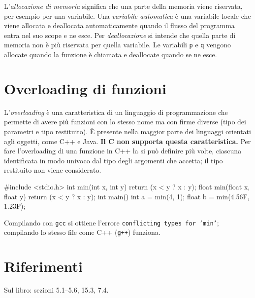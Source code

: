 \documentclass[11pt,a4paper]{article}
\begin{document}
L'\emph{allocazione di memoria} significa che una parte della memoria viene riservata, per esempio per una variabile. Una \emph{variabile automatica} è una variabile locale che viene allocata e deallocata automaticamente quando il flusso del programma entra nel suo scope e ne esce. Per \emph{deallocazione} si intende che quella parte di memoria non è più riservata per quella variabile. Le variabili \lstinline|p| e \lstinline|q| vengono allocate quando la funzione è chiamata e deallocate quando se ne esce.

\section{Overloading di funzioni}

L'\emph{overloading} è una caratteristica di un linguaggio di programmazione che permette di avere più funzioni con lo stesso nome ma con firme diverse (tipo dei parametri e tipo restituito). È presente nella maggior parte dei linguaggi orientati agli oggetti, come C++ e Java. \textbf{Il C non supporta questa caratteristica.} Per fare l'overloading di una funzione in C++ la si può definire più volte, ciascuna identificata in modo univoco dal tipo degli argomenti che accetta; il tipo restituito non viene considerato.

\begin{esempio}
\begin{codice}
#include <stdio.h>
int min(int x, int y) {
    return (x < y ? x : y);
}
float min(float x, float y) {
    return (x < y ? x : y);
}
int main() {
    int a = min(4, 1);
    float b = min(4.56F, 1.23F);
}
\end{codice}
Compilando con \texttt{gcc} si ottiene l'errore \texttt{conflicting types for 'min'}; compilando lo stesso file come C++ (\texttt{g++}) funziona.
\end{esempio}

\section{Riferimenti}

Sul libro: sezioni 5.1--5.6, 15.3, 7.4.
\end{document}
